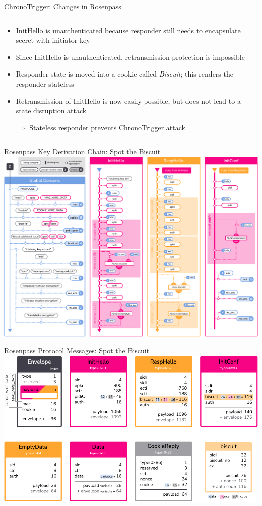 \begin{frame}{ChronoTrigger: Changes in Rosenpass}
\begin{columns}[fullwidth,c]
    \begin{column}{.56\linewidth}
      \begin{itemize}
        \item InitHello is unauthenticated because responder still needs to encapsulate secret with initiator key
        \item Since InitHello is unauthenticated, retransmission protection is impossible
        \item Responder state is moved into a cookie called \emph{Biscuit}; this renders the responder stateless
        \item Retransmission of InitHello is now easily possible, but does not lead to a state disruption attack
        \item[$\Rightarrow$] Stateless responder prevents ChronoTrigger attack
      \end{itemize}
    \end{column}
  \end{columns}
\end{frame}




\begin{frame}{Rosenpass Key Derivation Chain: Spot the Biscuit}
  \centering
  \includegraphics[height=.85\textheight]{graphics/rosenpass-wp-hashing-tree-rgb.pdf}
\end{frame}




\begin{frame}{Rosenpass Protocol Messages: Spot the Biscuit}
    \includegraphics[height=.85\textheight]{graphics/rp-messages-04-all-rgb.pdf}
\end{frame}
